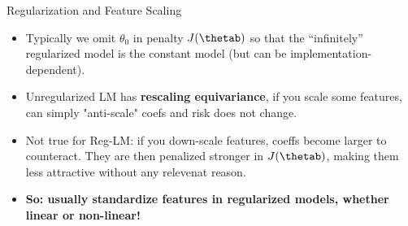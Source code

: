 \documentclass[11pt,compress,t,notes=noshow, xcolor=table]{beamer}
\begin{document}
\begin{vbframe}{Regularization and Feature Scaling}

  \begin{itemize}
    \item Typically we omit $\theta_0$ in penalty $J(\thetab)$ so that the ``infinitely'' regularized model is the constant model (but can be implementation-dependent).
    \item Unregularized LM has \textbf{rescaling equivariance}, if you scale some features, can simply "anti-scale" coefs and risk does not change.
    \item Not true for Reg-LM: if you down-scale features, coeffs become larger to counteract. They are then penalized stronger in $J(\thetab)$, making them less attractive without any relevenat reason.
    \item \textbf{So: usually standardize features in regularized models, whether linear or non-linear!}  
      
  \end{itemize}

\framebreak



\end{vbframe}
\end{document}
